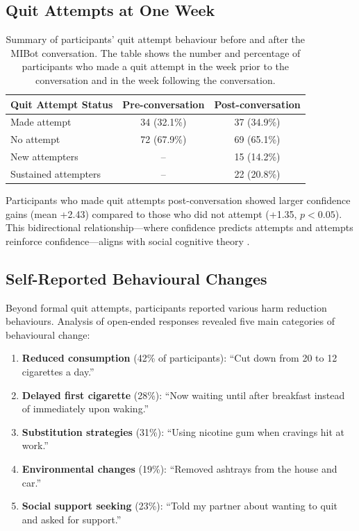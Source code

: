 \label{sec:behavioural-outcomes}

\subsection*{Quit Attempts at One Week}

\begin{table}[ht]
  \centering
  \small
  \setlength{\tabcolsep}{4pt}
  \renewcommand{\arraystretch}{1.1}
  \begin{tabular}{@{}lcc@{}}
    \toprule
    \textbf{Quit Attempt Status} & \textbf{Pre-conversation} & \textbf{Post-conversation} \\
    \midrule
    Made attempt & 34 (32.1\%) & 37 (34.9\%) \\
    No attempt & 72 (67.9\%) & 69 (65.1\%) \\
    \midrule
    New attempters & -- & 15 (14.2\%) \\
    Sustained attempters & -- & 22 (20.8\%) \\
    \bottomrule
  \end{tabular}
  \caption[Quit Attempt Behaviour Before and After MIBot]{Summary of participants' quit attempt behaviour before and after the MIBot conversation. The table shows the number and percentage of participants who made a quit attempt in the week prior to the conversation and in the week following the conversation.}
  \label{table:quit_attempts}
\end{table}

Participants who made quit attempts post-conversation showed larger confidence gains (mean +2.43) compared to those who did not attempt (+1.35, $p<0.05$). This bidirectional relationship---where confidence predicts attempts and attempts reinforce confidence---aligns with social cognitive theory \citep{Bandura1986}.

\subsection*{Self-Reported Behavioural Changes}

Beyond formal quit attempts, participants reported various harm reduction behaviours. Analysis of open-ended responses revealed five main categories of behavioural change:

\begin{enumerate}
\item \textbf{Reduced consumption} (42\% of participants): ``Cut down from 20 to 12 cigarettes a day.''
\item \textbf{Delayed first cigarette} (28\%): ``Now waiting until after breakfast instead of immediately upon waking.''
\item \textbf{Substitution strategies} (31\%): ``Using nicotine gum when cravings hit at work.''
\item \textbf{Environmental changes} (19\%): ``Removed ashtrays from the house and car.''
\item \textbf{Social support seeking} (23\%): ``Told my partner about wanting to quit and asked for support.''
\end{enumerate}

